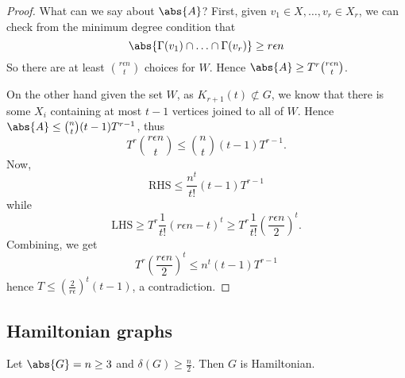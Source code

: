 \documentclass{article}
\begin{document}
\begin{proof}
    What can we say about $\abs{A}$?
    First, given $v_1 \in X, \dotsc, v_r \in X_r$, we can check from the minimum degree condition that
    \begin{equation*}
        \abs{\Gamma(v_1) \cap \dotsc \cap \Gamma(v_r)} \geq r \epsilon n
    \end{equation*}
    So there are at least $\binom{r \epsilon n}{t}$ choices for $W$. Hence $\abs{A} \geq T^r \binom{r \epsilon n}{t}$.

    On the other hand given the set $W$, as $K_{r+1}(t) \not\subset G$, we know that there is some $X_i$ containing at most $t-1$ vertices joined to all of $W$.
    Hence $\abs{A} \leq \binom{n}{t} (t-1) T^{r-1}$, thus
    \begin{equation*}
        T^r \binom{r \epsilon n}{t} \leq \binom{n}{t} (t-1) T^{r-1}.
    \end{equation*}
    Now,
    \begin{equation*}
        \text{RHS} \leq \frac{n^t}{t!} (t-1) T^{r-1}
    \end{equation*}
    while
    \begin{equation*}
        \text{LHS} \geq T^r \frac{1}{t!} (r \epsilon n - t)^t \geq T^r \frac{1}{t!} \left(\frac{r \epsilon n}{2}\right)^t.
    \end{equation*}
    Combining, we get
    \begin{equation*}
        T^r \left(\frac{r \epsilon n}{2}\right)^t \leq n^t (t-1) T^{r-1}
    \end{equation*}
    hence $T \leq (\frac{2}{r \epsilon})^t (t-1)$, a contradiction.
\end{proof}
\subsection{Hamiltonian graphs}









\begin{nthm}\label{thm:17}
    Let $\abs{G} = n \geq 3$ and $\delta(G) \geq \frac{n}{2}$. Then $G$ is Hamiltonian.
\end{nthm}
\end{document}
